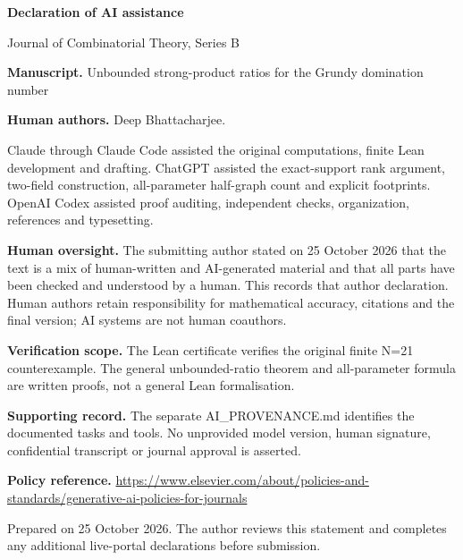 \documentclass[11pt]{article}
\begin{document}
{\Large\bfseries\color{ink} Declaration of AI assistance}\par
Journal of Combinatorial Theory, Series B\par{}\par\medskip
\textbf{Manuscript.} Unbounded strong-product ratios for the Grundy domination number\par

\textbf{Human authors.} Deep Bhattacharjee.\par

Claude through Claude Code assisted the original computations, finite Lean development and drafting. ChatGPT assisted the exact-support rank argument, two-field construction, all-parameter half-graph count and explicit footprints. OpenAI Codex assisted proof auditing, independent checks, organization, references and typesetting.\par

\textbf{Human oversight.} The submitting author stated on 25 October 2026 that the text is a mix of human-written and AI-generated material and that all parts have been checked and understood by a human. This records that author declaration. Human authors retain responsibility for mathematical accuracy, citations and the final version; AI systems are not human coauthors.\par

\textbf{Verification scope.} The Lean certificate verifies the original finite N=21 counterexample. The general unbounded-ratio theorem and all-parameter formula are written proofs, not a general Lean formalisation.\par

\textbf{Supporting record.} The separate AI\_PROVENANCE.md identifies the documented tasks and tools. No unprovided model version, human signature, confidential transcript or journal approval is asserted.\par

\textbf{Policy reference.} \url{https://www.elsevier.com/about/policies-and-standards/generative-ai-policies-for-journals}\par

{\small Prepared on 25 October 2026. The author reviews this statement and completes any additional live-portal declarations before submission.}
\end{document}
